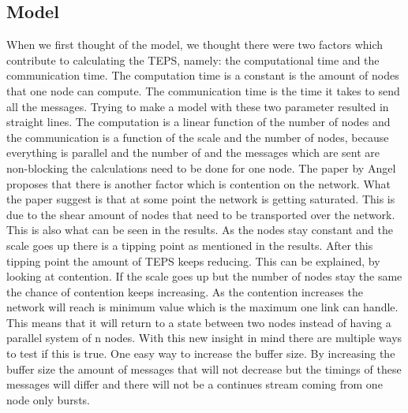 \subsection{Model}
When we first thought of the model, we thought there were two factors which contribute to calculating the TEPS, namely: the computational time and the communication time. The computation time is a constant is the amount of nodes that one node can compute. The communication time is the time it takes to send all the messages. Trying to make a model with these two parameter resulted in straight lines. The computation is a linear function of the number of nodes and the communication is a function of the scale and the number of nodes, because everything is parallel and the number of and the messages which are sent are non-blocking the calculations need to be done for one node. 
The paper by Angel proposes that there is another factor which is contention on the network. What the paper suggest is that at some point the network is getting saturated. This is due to the shear amount of nodes that need to be transported over the network. This is also what can be seen in the results. As the nodes stay constant and the scale goes up there is a tipping point as mentioned in the results. After this tipping point the amount of TEPS keeps reducing. This can be explained, by looking at contention. If the scale goes up but the number of nodes stay the same the chance of contention keeps increasing. As the contention increases the network will reach is minimum value which is the maximum one link can handle. This means that it will return to a state between two nodes instead of having a parallel system of n nodes.
With this new insight in mind there are multiple ways to test if this is true. One easy way to increase the buffer size. By increasing the buffer size the amount of messages that will not decrease but the timings of these messages will differ and there will not be a continues stream coming from one node only bursts.



 